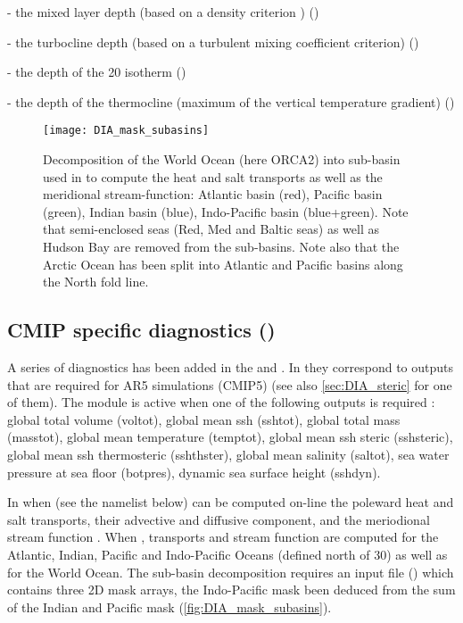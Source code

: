 \documentclass[../main/NEMO_manual]{subfiles}
\begin{document}
- the mixed layer depth (based on a density criterion \citep{de-boyer-montegut.madec.ea_JGR04}) ()

- the turbocline depth (based on a turbulent mixing coefficient criterion) ()

- the depth of the 20 isotherm ()

- the depth of the thermocline (maximum of the vertical temperature gradient) ()

\begin{figure}[!t]
  \centering
  \texttt{[image: DIA\_mask\_subasins]}
  \caption[Decomposition of the World Ocean to compute transports as well as
  the meridional stream-function]{
    Decomposition of the World Ocean (here ORCA2) into sub-basin used in to
    compute the heat and salt transports as well as the meridional stream-function:
    Atlantic basin (red), Pacific basin (green),
    Indian basin (blue), Indo-Pacific basin (blue+green).
    Note that semi-enclosed seas (Red, Med and Baltic seas) as well as
    Hudson Bay are removed from the sub-basins.
    Note also that the Arctic Ocean has been split into Atlantic and
    Pacific basins along the North fold line.
  }
  \label{fig:DIA_mask_subasins}
\end{figure}

\subsection[CMIP specific diagnostics (\textit{diaar5.F90}, \textit{diaptr.F90})]{CMIP specific diagnostics (\protect{})}

A series of diagnostics has been added in the  and .
In  they correspond to outputs that are required for AR5 simulations (CMIP5)
(see also \autoref{sec:DIA_steric} for one of them).
The module  is active when one of the following outputs is required :
global total volume (voltot), global mean ssh (sshtot), global total mass (masstot), global mean temperature (temptot),
global mean ssh steric (sshsteric), global mean ssh thermosteric (sshthster), global mean salinity (saltot),
sea water pressure at sea floor (botpres), dynamic sea surface height (sshdyn).

In  when 
(see the  namelist below) can be computed on-line the poleward heat and salt transports,
their advective and diffusive component, and the meriodional stream function .
When , transports and stream function are computed for the Atlantic, Indian,
Pacific and Indo-Pacific Oceans (defined north of 30) as well as for the World Ocean.
The sub-basin decomposition requires an input file () which contains three 2D mask arrays,
the Indo-Pacific mask been deduced from the sum of the Indian and Pacific mask (\autoref{fig:DIA_mask_subasins}).
\end{document}
